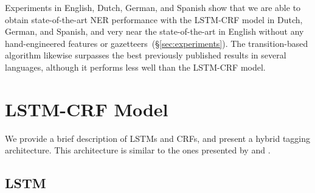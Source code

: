 \documentclass[11pt,letterpaper]{article}
\newcommand{\ignore}[1]{}
\newcommand{\guillaumecomment}[1]{\ignore{\textcolor{orange}{\textbf{[#1 --\textsc{GL}]}}}}
\begin{document}

Experiments in English, Dutch, German, and Spanish show that we are able to obtain state-of-the-art NER performance with the LSTM-CRF model in Dutch, German, and Spanish, and very near the state-of-the-art in English without any hand-engineered features or gazetteers~(\S\ref{sec:experiments}). The transition-based algorithm likewise surpasses the best previously published results in several languages, although it performs less well than the LSTM-CRF model.
\guillaumecomment{actually we dont have sota on dutch if we include this recent byte model that uses external NER data :/}

\section{LSTM-CRF Model}
\label{lstmcrf}

We provide a brief description of LSTMs and CRFs, and present a hybrid tagging architecture. This architecture is similar to the ones presented by  and .


\subsection{LSTM}
\label{sec:lstm}
\end{document}
